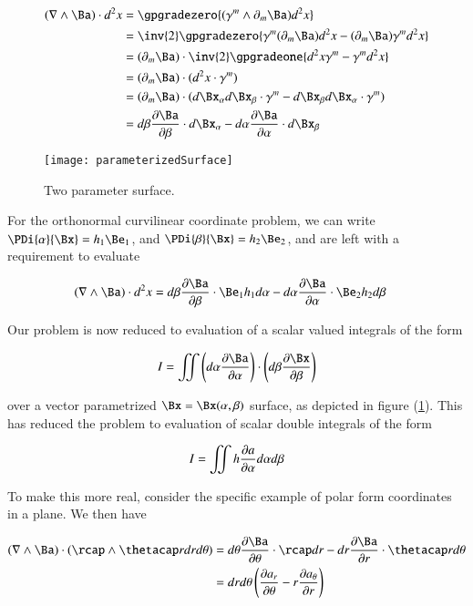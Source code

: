 \begin{align*}
(\grad \wedge \Ba) \cdot d^2 x
&=
\gpgradezero{ (\gamma^m \wedge \partial_m \Ba) d^2 x} \\
&=
\inv{2} \gpgradezero{ \gamma^m (\partial_m \Ba) d^2 x - (\partial_m \Ba) \gamma^m d^2 x} \\
&=
(\partial_m \Ba) \cdot \inv{2} \gpgradeone{ d^2 x \gamma^m - \gamma^m d^2 x} \\
&=
(\partial_m \Ba) \cdot ( d^2 x \cdot \gamma^m ) \\
&=
(\partial_m \Ba) \cdot ( d\Bx_\alpha d\Bx_\beta \cdot \gamma^m - d\Bx_\beta d\Bx_\alpha \cdot \gamma^m) \\
&=
d\beta \PD{\beta}{\Ba} \cdot d\Bx_\alpha -d\alpha \PD{\alpha}{\Ba} \cdot d\Bx_\beta 
\end{align*}

\begin{figure}[htp]
\centering
\texttt{[image: parameterizedSurface]}
\caption{Two parameter surface.}\label{fig:parameterizedSurface}
\end{figure}

For the orthonormal curvilinear coordinate problem, we can write $\PDi{\alpha}{\Bx} = h_1 \Be_1$, and $\PDi{\beta}{\Bx} = h_2 \Be_2$, and are left with a requirement to evaluate

\begin{align*}
(\grad \wedge \Ba) \cdot d^2 x
&=
d\beta \PD{\beta}{\Ba} \cdot \Be_1 h_1 d\alpha -d\alpha \PD{\alpha}{\Ba} \cdot \Be_2 h_2 d\beta
\end{align*}

Our problem is now reduced to evaluation of a scalar valued integrals of the form

\begin{align*}
I = \iint \left( d\alpha \PD{\alpha}{\Ba} \right) \cdot \left( d\beta \PD{\beta}{\Bx} \right)
\end{align*}

over a vector parametrized $\Bx = \Bx(\alpha, \beta)$ surface, as depicted in figure (\ref{fig:parameterizedSurface}).  This has reduced the problem to evaluation of scalar double integrals of the form

\begin{align*}
I = \iint h \frac{\partial {a}}{\partial {\alpha}} d\alpha d\beta 
\end{align*}

To make this more real, consider the specific example of polar form coordinates in a plane.  We then have

\begin{align*}
(\grad \wedge \Ba) \cdot (\rcap \wedge \thetacap r dr d\theta)
&=
d\theta \PD{\theta}{\Ba} \cdot \rcap dr -dr \PD{r}{\Ba} \cdot \thetacap r d\theta \\
&=
dr d\theta \left( \PD{\theta}{a_r} - r \PD{r}{a_\theta} \right)
\end{align*}

\EndNoBibArticle
